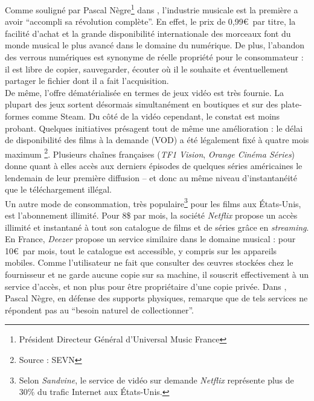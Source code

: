 \documentclass[a4paper]{report}
\begin{document}
	Comme souligné par Pascal Nègre\footnote{Président Directeur Général d'Universal Music France} dans \cite{podcast-industrie-musicale}, l'industrie musicale est la première a avoir ``accompli sa révolution complète''. En effet, le prix de 0,99\euro\ par titre, la facilité d'achat et la grande disponibilité internationale des morceaux font du monde musical le plus avancé dans le domaine du numérique. De plus, l'abandon des verrous numériques est synonyme de réelle propriété pour le consommateur : il est libre de copier, sauvegarder, écouter où il le souhaite et éventuellement partager le fichier dont il a fait l'acquisition.\\

	De même, l'offre dématérialisée en termes de jeux vidéo est très fournie. La plupart des jeux sortent désormais simultanément en boutiques et sur des plate-formes comme Steam. Du côté de la vidéo cependant, le constat est moins probant. Quelques initiatives présagent tout de même une amélioration : le délai de disponibilité des films à la demande (VOD) a été légalement fixé à quatre mois maximum \footnote{Source : SEVN}. Plusieurs chaînes françaises (\emph{TF1 Vision}, \emph{Orange Cinéma Séries}) donne quant à elles accès aux derniers épisodes de quelques séries américaines le lendemain de leur première diffusion – et donc au même niveau d'instantanéité que le téléchargement illégal.\\

	Un autre mode de consommation, très populaire\footnote{Selon \emph{Sandvine}, le service de vidéo sur demande \emph{Netflix} représente plus de 30\% du trafic Internet aux États-Unis.} pour les films aux États-Unis, est l'abonnement illimité. Pour 8\$ par mois, la société \emph{Netflix} propose un accès illimité et instantané à tout son catalogue de films et de séries grâce en \emph{streaming}.\\

	En France, \emph{Deezer} propose un service similaire dans le domaine musical : pour 10\euro\ par mois, tout le catalogue est accessible, y compris sur les appareils mobiles. Comme l'utilisateur ne fait que consulter des œuvres stockées chez le fournisseur et ne garde aucune copie sur sa machine, il souscrit effectivement à un service d'accès, et non plus pour être propriétaire d'une copie privée. Dans \cite{podcast-industrie-musicale}, Pascal Nègre, en défense des supports physiques, remarque que de tels services ne répondent pas au ``besoin naturel de collectionner''.\\
\end{document}
